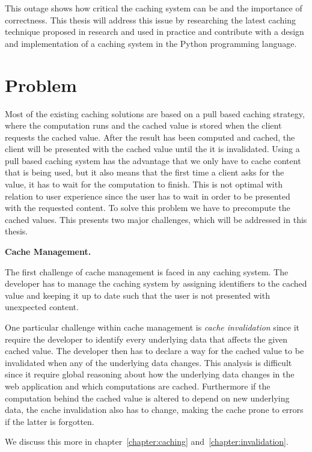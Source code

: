 This outage shows how critical the caching system can be and the importance of correctness. This thesis will address this issue by researching the latest caching technique proposed in research and used in practice and contribute with a design and implementation of a caching system in the Python programming language.

\section{Problem}

Most of the existing caching solutions are based on a pull based caching strategy, where the computation runs and the cached value is stored when the client requests the cached value. After the result has been computed and cached, the client will be presented with the cached value until the it is invalidated. Using a pull based caching system has the advantage that we only have to cache content that is being used, but it also means that the first time a client asks for the value, it has to wait for the computation to finish. This is not optimal with relation to user experience since the user has to wait in order to be presented with the requested content. To solve this problem we have to precompute the cached values. This presents two major challenges, which will be addressed in this thesis.

\textbf{Cache Management.}

The first challenge of cache management is faced in any caching system. The developer has to manage the caching system by assigning identifiers to the cached value and keeping it up to date such that the user is not presented with unexpected content.

One particular challenge within cache management is \emph{cache invalidation} since it require the developer to identify every underlying data that affects the given cached value. The developer then has to declare a way for the cached value to be invalidated when any of the underlying data changes. This analysis is difficult since it require global reasoning about how the underlying data changes in the web application and which computations are cached. Furthermore if the computation behind the cached value is altered to depend on new underlying data, the cache invalidation also has to change, making the cache prone to errors if the latter is forgotten.

We discuss this more in chapter~\ref{chapter:caching} and~\ref{chapter:invalidation}.

